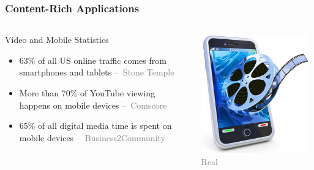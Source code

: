 \documentclass[10pt]{beamer}
\begin{document}
\begin{frame}
\frametitle{Content-Rich Applications}
\begin{center}

\end{center}
\begin{columns}
\begin{block}{Video and Mobile Statistics}
  \begin{itemize}
  \item 63\% of all US online traffic comes from smartphones and tablets
    {\tiny \textcolor{gray}{--~Stone Temple}}
  \item More than 70\% of YouTube viewing happens on mobile devices
    {\tiny \textcolor{gray}{--~Comscore}}
  \item 65\% of all digital media time is spent on mobile devices
    {\tiny \textcolor{gray}{--~Business2Community}}
  \end{itemize}
\end{block}
  \begin{center}
  \includegraphics[width=0.96\textwidth]{Figures/Video-Real.jpg}
  \newline
  {\tiny \textcolor{gray}{\textcopyright Real}}
  \end{center}
\end{columns}
\end{frame}
\end{document}
